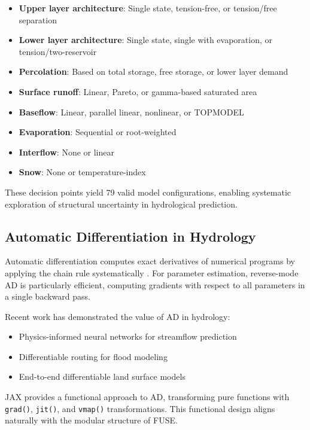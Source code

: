 \documentclass[11pt,a4paper]{article}
\begin{document}
\begin{itemize}
    \item \textbf{Upper layer architecture}: Single state, tension-free, or tension/free separation
    \item \textbf{Lower layer architecture}: Single state, single with evaporation, or tension/two-reservoir
    \item \textbf{Percolation}: Based on total storage, free storage, or lower layer demand
    \item \textbf{Surface runoff}: Linear, Pareto, or gamma-based saturated area
    \item \textbf{Baseflow}: Linear, parallel linear, nonlinear, or TOPMODEL
    \item \textbf{Evaporation}: Sequential or root-weighted
    \item \textbf{Interflow}: None or linear
    \item \textbf{Snow}: None or temperature-index
\end{itemize}

These decision points yield 79 valid model configurations, enabling systematic exploration of structural uncertainty in hydrological prediction.

\subsection{Automatic Differentiation in Hydrology}

Automatic differentiation computes exact derivatives of numerical programs by applying the chain rule systematically \citep{griewank2008evaluating}. For parameter estimation, reverse-mode AD is particularly efficient, computing gradients with respect to all parameters in a single backward pass.

Recent work has demonstrated the value of AD in hydrology:
\begin{itemize}
    \item Physics-informed neural networks for streamflow prediction \citep{shen2018differentiable}
    \item Differentiable routing for flood modeling \citep{droute2024}
    \item End-to-end differentiable land surface models \citep{tsai2021}
\end{itemize}

JAX provides a functional approach to AD, transforming pure functions with \texttt{grad()}, \texttt{jit()}, and \texttt{vmap()} transformations. This functional design aligns naturally with the modular structure of FUSE.
\end{document}
